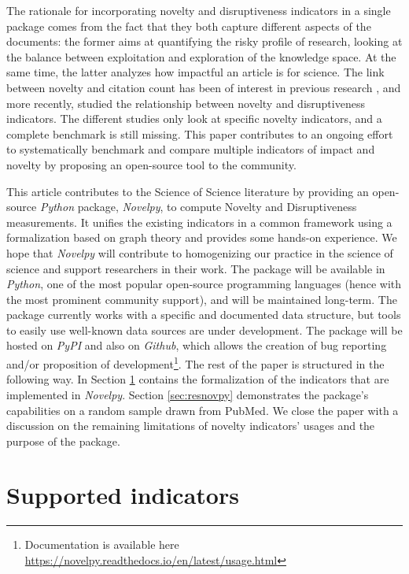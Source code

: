 The rationale for incorporating novelty and disruptiveness indicators in a single package comes from the fact that they both capture different aspects of the documents: the former aims at quantifying the risky profile of research, looking at the balance between exploitation and exploration \citep{march1991exploration} of the knowledge space. At the same time, the latter analyzes how impactful an article is for science. The link between novelty and citation count has been of interest in previous research \citep{uzzi2013atypical,wang2017bias}, and more recently, \cite{lin2021new} studied the relationship between novelty and disruptiveness indicators. The different studies only look at specific novelty indicators, and a complete benchmark is still missing. This paper contributes to an ongoing effort to systematically benchmark and compare multiple indicators of impact and novelty by proposing an open-source tool to the community.

This article contributes to the Science of Science literature by providing an open-source \textit{Python} package, \textit{Novelpy}, to compute Novelty and Disruptiveness measurements. It unifies the existing indicators in a common framework using a formalization based on graph theory and provides some hands-on experience. We hope that \textit{Novelpy} will contribute to homogenizing our practice in the science of science and support researchers in their work. The package will be available in \textit{Python}, one of the most popular open-source programming languages (hence with the most prominent community support), and will be maintained long-term. The package currently works with a specific and documented data structure, but tools to easily use well-known data sources are under development. The package will be hosted on \textit{PyPI} and also on \textit{Github}, which allows the creation of bug reporting and/or proposition of development\footnote{\justifying Documentation is available here \url{https://novelpy.readthedocs.io/en/latest/usage.html}}. The rest of the paper is structured in the following way. In Section \ref{sec:indic} contains the formalization of the indicators that are implemented in \textit{Novelpy}. Section \ref{sec:resnovpy} demonstrates the package's capabilities on a random sample drawn from PubMed. We close the paper with a discussion on the remaining limitations of novelty indicators' usages and the purpose of the package.

\section{Supported indicators}
\label{sec:indic}

